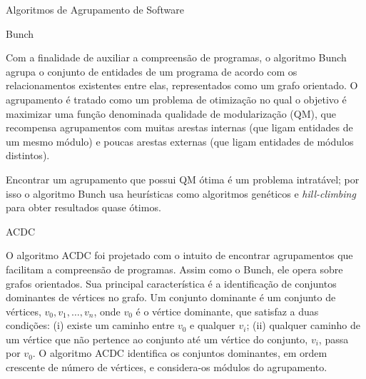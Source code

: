 \begin{section}{Algoritmos de Agrupamento de Software}

\begin{subsection}{Bunch}

Com a finalidade de auxiliar a compreensão de programas, o algoritmo Bunch \cite{Mancoridis1998} agrupa o conjunto de entidades de um programa de acordo com os relacionamentos existentes entre elas, representados como um grafo orientado. O agrupamento é tratado como um problema de otimização no qual o objetivo é maximizar uma função denominada qualidade de modularização (QM), que recompensa agrupamentos com muitas arestas internas (que ligam entidades de um mesmo módulo) e poucas arestas externas (que ligam entidades de módulos distintos).


Encontrar um agrupamento que possui QM ótima é um problema intratável; por isso o algoritmo Bunch usa heurísticas como algoritmos genéticos e \emph{hill-climbing} para obter resultados quase ótimos.

\end{subsection}


\begin{subsection}{ACDC}

O algoritmo ACDC \cite{Tzerpos2000} foi projetado com o intuito de encontrar agrupamentos que facilitam a compreensão de programas. Assim como o Bunch, ele opera sobre grafos orientados. Sua principal característica é a identificação de conjuntos dominantes de vértices no grafo. Um conjunto dominante é um conjunto de vértices, $v_0, v_1, \ldots{}, v_n$, onde $v_0$ é o vértice dominante, que satisfaz a duas condições: (i) existe um caminho entre $v_0$ e qualquer $v_i$; (ii) qualquer caminho de um vértice que não pertence ao conjunto até um vértice do conjunto, $v_i$, passa por $v_0$. O algoritmo ACDC identifica os conjuntos dominantes, em ordem crescente de número de vértices, e considera-os módulos do agrupamento. 

	
\end{subsection}

\end{section}

